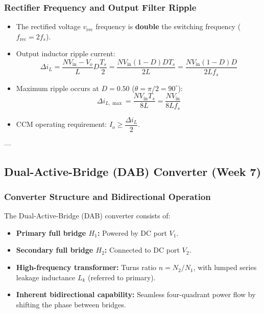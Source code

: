 \subsubsection{Rectifier Frequency and Output Filter Ripple}
\begin{itemize}
  \item The rectified voltage $v_{\mathrm{rec}}$ frequency is \textbf{double} the switching frequency ($f_{\mathrm{rec}} = 2 f_s$).
  \item Output inductor ripple current:
  \begin{equation}
  \Delta i_L = \frac{N V_{\mathrm{in}} - V_o}{L} D \frac{T_s}{2} = \frac{N V_{\mathrm{in}} (1-D) D T_s}{2 L} = \frac{N V_{\mathrm{in}} (1-D) D}{2 L f_s}
  \end{equation}
  \item Maximum ripple occurs at $D = 0.50$ ($\theta = \pi/2 = 90^\circ$):
  \begin{equation}
  \Delta i_{L,\max} = \frac{N V_{\mathrm{in}} T_s}{8 L} = \frac{N V_{\mathrm{in}}}{8 L f_s}
  \end{equation}
  \item CCM operating requirement: $I_o \ge \dfrac{\Delta i_L}{2}$.
\end{itemize}

---

\subsection{Dual-Active-Bridge (DAB) Converter (Week 7)}

\subsubsection{Converter Structure and Bidirectional Operation}
The Dual-Active-Bridge (DAB) converter consists of:
\begin{itemize}
  \item \textbf{Primary full bridge $H_1$:} Powered by DC port $V_1$.
  \item \textbf{Secondary full bridge $H_2$:} Connected to DC port $V_2$.
  \item \textbf{High-frequency transformer:} Turns ratio $n = N_2/N_1$, with lumped series leakage inductance $L_k$ (referred to primary).
  \item \textbf{Inherent bidirectional capability:} Seamless four-quadrant power flow by shifting the phase between bridges.
\end{itemize}

